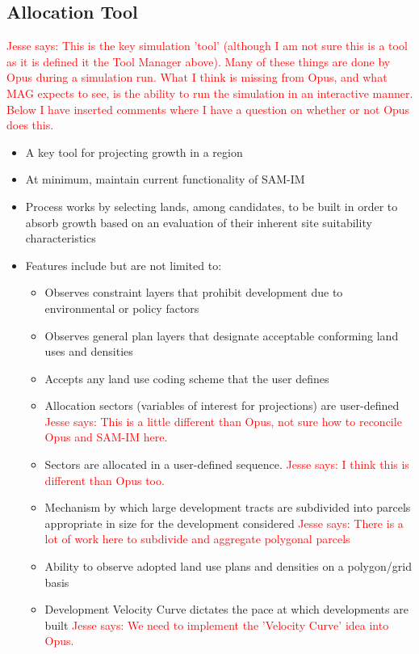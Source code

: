 \documentclass[titlepage]{article}
\begin{document}
\subsection{Allocation Tool}
	\textcolor{red}{Jesse says: This is the key simulation 'tool' (although I am not sure this is a tool as it is defined it the Tool Manager above).  Many of these things are done by Opus during a simulation run.  What I think is missing from Opus, and what MAG expects to see, is the ability to run the simulation in an interactive manner.  Below I have inserted comments where I have a question on whether or not Opus does this.}
\begin{itemize}
	\item A key tool for projecting growth in a region
	\item At minimum, maintain current functionality of SAM-IM
	\item Process works by selecting lands, among candidates, to be built in order to absorb growth based on an evaluation of their inherent site suitability characteristics
	\item Features include but are not limited to:
		\begin{itemize}
			\item Observes constraint layers that prohibit development due to environmental or policy factors
			\item Observes general plan layers that designate acceptable conforming land uses and densities
			\item Accepts any land use coding scheme that the user defines
			\item Allocation sectors (variables of interest for projections) are user-defined
				\textcolor{red}{Jesse says: This is a little different than Opus, not sure how to reconcile Opus and SAM-IM here.}
			\item Sectors are allocated in a user-defined sequence.
				\textcolor{red}{Jesse says: I think this is  different than Opus too.}
			\item Mechanism by which large development tracts are subdivided into parcels appropriate in size for the development considered
				\textcolor{red}{Jesse says: There is a lot of work here to subdivide and aggregate polygonal parcels}
			\item Ability to observe adopted land use plans and densities on a polygon/grid basis
			\item Development Velocity Curve dictates the pace at which developments are built
				\textcolor{red}{Jesse says: We need to implement the 'Velocity Curve' idea into Opus.}

\end{itemize}
\end{itemize}
\end{document}
